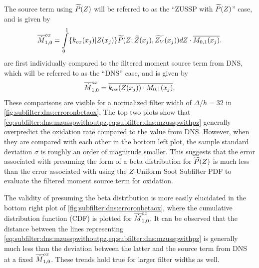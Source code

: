 The source term using $\pz$ will be referred to as the ``ZUSSP with $\pz$'' case, and is given by
\begin{equation}\label{eq:subfilter:dns:mzusspwithpz}
  \fst[M]{1,0}^{ox} = \int\limits_0^1 \{ k_{ox}(x_j)|Z(x_j) \}\tf{P}(Z; \tf{Z}(x_j),\tf{Z_V}(x_j)) dZ \cdot \mean{M_{0,1}(x_j)}.
\end{equation}
 are first individually compared to the filtered moment source term from DNS, which will be referred to as the ``DNS'' case, and is given by
\begin{equation}\label{eq:subfilter:dns:mdns}
  \fst[M]{1,0}^{ox} = \mean{ k_{ox}(Z(x_j)) \cdot M_{0,1}(x_j)}.
\end{equation}
These comparisons are visible for a normalized filter width of $\Delta/h = 32$ in \cref{fig:subfilter:dns:erroronbetaox}. The top two plots show that \cref{eq:subfilter:dns:mzusspwithoutpz,eq:subfilter:dns:mzusspwithpz} generally overpredict the oxidation rate compared to the value from DNS. However, when they are compared with each other in the bottom left plot, the sample standard deviation $\sigma$ is roughly an order of magnitude smaller. This suggests that the error associated with presuming the form of a beta distribution for $\pz$ is much less than the error associated with using the $Z$-Uniform Soot Subfilter PDF to evaluate the filtered moment source term for oxidation.

The validity of presuming the beta distribution is more easily elucidated in the bottom right plot of \cref{fig:subfilter:dns:erroronbetaox}, where the cumulative distribution function (CDF) is plotted for $\fst[M]{1,0}^{ox}$. It can be observed that the distance between the lines representing \cref{eq:subfilter:dns:mzusspwithoutpz,eq:subfilter:dns:mzusspwithpz} is generally much less than the deviation between the latter and the source term from DNS at a fixed $\fst[M]{1,0}^{ox}$. These trends hold true for larger filter widths as well. %

